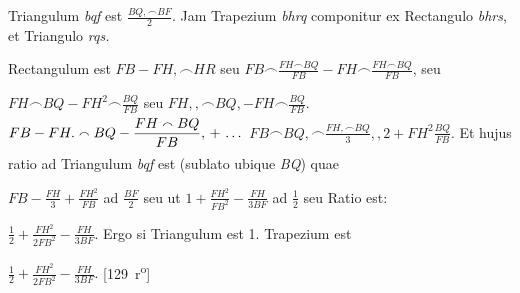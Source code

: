 \pend%
\newpage%
\pstart%
\noindent%
Triangulum \textit{bqf} est $\displaystyle\frac{BQ,\smallfrown BF}{2}$.
Jam Trapezium \textit{bhrq} componitur ex Rectangulo \textit{bhrs}, et Triangulo \textit{rqs.}
\rule[-4mm]{0mm}{10mm}Rectangulum est $\displaystyle FB-FH,\smallfrown HR$ seu
$\displaystyle FB\smallfrown\frac{FH\smallfrown BQ}{FB} - \displaystyle FH\smallfrown\frac{FH\smallfrown BQ}{FB}$, seu
\rule[-4mm]{0mm}{10mm}$\displaystyle FH\smallfrown BQ-FH^{2}\smallfrown\frac{BQ}{FB}$ seu $\displaystyle FH,,\smallfrown BQ,-FH\smallfrown \frac{BQ}{FB}$.
$\displaystyle FB-FH.\smallfrown BQ-\frac{FH\smallfrown BQ}{FB},\, + \, \dots \rule[-4mm]{0mm}{10mm}$
$\displaystyle FB\smallfrown BQ,\smallfrown \frac{FH,\smallfrown BQ}{3},,2+FH^{2}\frac{BQ}{FB}.$
Et hujus ratio ad Triangulum \textit{bqf} est
(sublato ubique \textit{BQ})
quae \rule[-4mm]{0mm}{10mm}$\displaystyle FB-\frac{FH}{3}+\frac{FH^{2}}{FB}$ ad $\displaystyle \frac{BF}{2}$
seu ut $\displaystyle 1+\frac{FH^{2}}{FB^{2}}-\frac{FH}{3BF}$ ad $\displaystyle \frac {1}{2}$
seu Ratio est: \rule[-4mm]{0mm}{10mm}$\displaystyle\frac{1}{2}+\frac{FH^{2}}{2FB^{2}}-\frac{FH}{3BF}.$
Ergo si Triangulum est 1. Trapezium est
\rule[-4mm]{0mm}{10mm}%
$\displaystyle\frac{1}{2}+\frac{FH^{2}}{2FB^{2}}-\frac{FH}{3BF}.$
[129~r\textsuperscript{o}]%
\pend